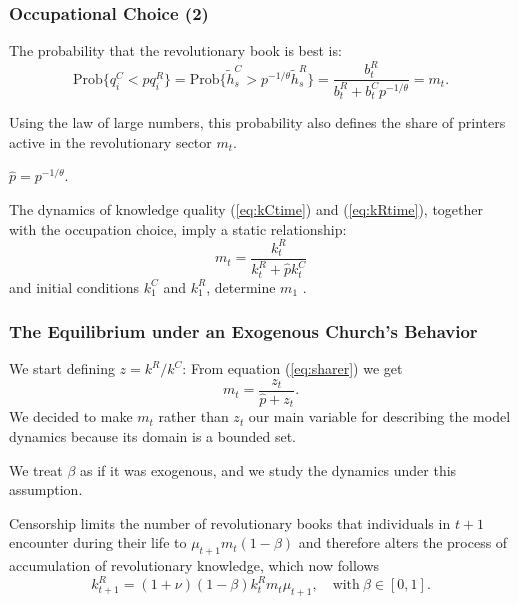 \documentclass[usepdftitle=false,aspectratio=169,xcolor=dvipsnames]{beamer}
\begin{document}
	\begin{frame}
\frametitle{Occupational Choice (2)}

   The probability that the revolutionary book is best is:
\begin{equation}
\text{Prob}\{q^C_i<p q^R_i\}=\text{Prob}\{\tilde{h}^C_s>p^{-1/\theta}\tilde{h}^R_s\}=\frac{b^R_t}{b^R_t+b^C_t p^{-1/\theta}}=m_t.\label{eq:occupation}
\end{equation}


Using the law of large numbers, this probability also defines the share of printers active in the revolutionary sector $m_t$.

$\hat{p}=p^{-1/\theta}$.

The dynamics of knowledge quality (\ref{eq:kCtime}) and (\ref{eq:kRtime}),  together with the occupation choice, imply a static relationship:
\begin{equation}\label{eq:sharer}
m_t=\frac{k^R_t}{k^R_t+\hat{p}k^C_t}
\end{equation}
and initial conditions $k_{1}^C$ and $k_{1}^R$, determine $m_{1}$ .

\end{frame}





	\begin{frame}
\frametitle{The Equilibrium under an Exogenous Church's Behavior}


We start defining $z=k^R/k^C$: From equation (\ref{eq:sharer}) we get
\begin{equation}
m_t=\frac{z_t}{\hat{p}+z_t}\label{eq:sharer2}.
\end{equation}
 We decided to make $m_t$ rather than $z_t$ our main variable for describing the model dynamics because its domain is a bounded set.


We treat $\beta$ as if it was exogenous, and we study the dynamics under this assumption.

Censorship limits the number of revolutionary books that individuals in $t+1$ encounter during their life to $\mu_{t+1} m_t (1-\beta)$ and therefore alters the process of accumulation of revolutionary knowledge, which now follows
\begin{equation}\label{eq:censorship}
k_{t+1}^R=(1+\nu)(1-\beta)k_{t}^R m_{t} \mu_{t+1}, \quad\text{with} \ \beta\in[0,1].
\end{equation}
\end{frame}
\end{document}
